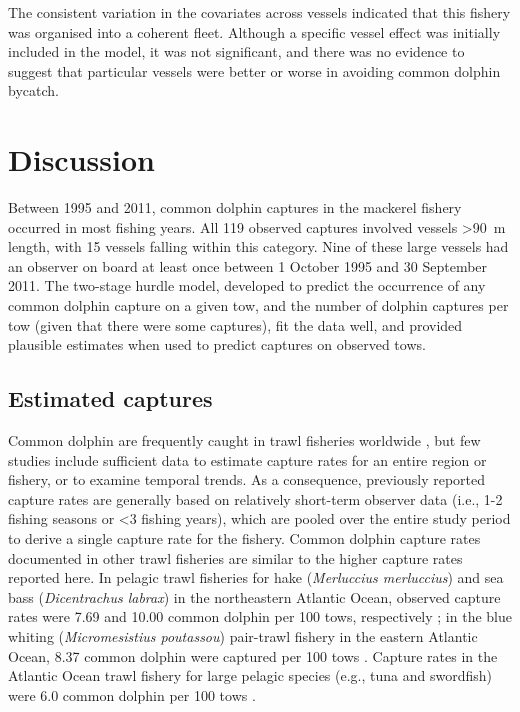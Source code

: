 \documentclass[10pt]{article}
\begin{document}
The consistent variation in the covariates across vessels indicated that this fishery was organised into a coherent fleet.  Although a specific vessel effect was initially included in the model, it was not significant, and there was no evidence to suggest that particular vessels were better or worse in avoiding common dolphin bycatch. 

\section*{Discussion}

Between 1995 and 2011, common dolphin captures in the mackerel fishery occurred in most fishing years.  All 119 observed captures involved vessels \textgreater90~m length, with 15 vessels falling within this category.  Nine of these large vessels had an observer on board at least once between 1 October 1995 and 30 September 2011.  The two-stage hurdle model, developed to predict the occurrence of any common dolphin capture on a given tow, and the number of dolphin captures per tow (given that there were some captures), fit the data well, and provided plausible estimates when used to predict captures on observed tows. 



\subsection*{Estimated captures}
Common dolphin are frequently caught in trawl fisheries worldwide \cite{fertl_cetacean_1997}, but few studies include sufficient data to estimate capture rates for an entire region or fishery, or to examine temporal trends.  As a consequence, previously reported capture rates are generally based on relatively short-term observer data (i.e., 1-2 fishing seasons or \textless3 fishing years), which are pooled over the entire study period to derive a single capture rate for the fishery.  Common dolphin capture rates documented in other trawl fisheries are similar to the higher capture rates reported here. In pelagic trawl fisheries for hake (\emph{Merluccius merluccius}) and sea bass (\emph{Dicentrachus labrax}) in the northeastern Atlantic Ocean, observed capture rates were 7.69 and 10.00 common dolphin per 100 tows, respectively \cite{morizur_incidental_1999}; in the blue whiting (\emph{Micromesistius poutassou}) pair-trawl fishery in the eastern Atlantic Ocean, 8.37 common dolphin were captured per 100 tows \cite{fernandez_incidental_2010}.
  Capture rates in the Atlantic Ocean trawl fishery for large pelagic
  species (e.g., tuna and swordfish) were 6.0 common dolphin per 100
  tows \cite{northridge_estimation_1996}.  
\end{document}
